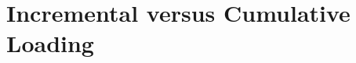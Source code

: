 \documentclass[bigger]{beamer}
\begin{document}
\nopagecolor

\section{Incremental versus Cumulative Loading}
\begin{frame}
  \begin{center}
    \incrementalcumulativeloads[1.1]
  \end{center}
\end{frame}
\end{document}
